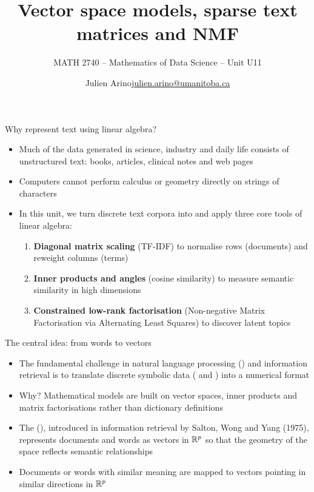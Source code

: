 \documentclass[aspectratio=169]{beamer}\usepackage[]{graphicx}\usepackage[]{xcolor}
\subtitle{MATH 2740 -- Mathematics of Data Science -- Unit U11}
\author{\texorpdfstring{Julien Arino\newline\url{julien.arino@umanitoba.ca}}{Julien Arino}}
\institute{Department of Mathematics @ University of Manitoba}
\title{Vector space models, sparse text matrices and NMF}
\begin{document}
\setcounter{theorem}{166}

\SStitlepage
\SSoutlinepage


\begin{frame}{Why represent text using linear algebra?}
\begin{itemize}
\item Much of the data generated in science, industry and daily life consists of unstructured text: books, articles, clinical notes and web pages
\vfill
\item Computers cannot perform calculus or geometry directly on strings of characters
\vfill
\item In this unit, we turn discrete text corpora into  and apply three core tools of linear algebra:
\begin{enumerate}
\item \textbf{Diagonal matrix scaling} (TF-IDF) to normalise rows (documents) and reweight columns (terms)
\item \textbf{Inner products and angles} (cosine similarity) to measure semantic similarity in high dimensions
\item \textbf{Constrained low-rank factorisation} (Non-negative Matrix Factorisation via Alternating Least Squares) to discover latent topics
\end{enumerate}
\end{itemize}
\end{frame}



\begin{frame}{The central idea: from words to vectors}
\begin{itemize}
\item The fundamental challenge in natural language processing () and information retrieval is to translate discrete symbolic data ( and ) into a numerical format
\vfill
\item Why? Mathematical models are built on vector spaces, inner products and matrix factorisations rather than dictionary definitions
\vfill
\item The  (), introduced in information retrieval by Salton, Wong and Yang (1975), represents documents and words as vectors in $\mathbb{R}^p$ so that the geometry of the space reflects semantic relationships
\vfill
\item Documents or words with similar meaning are mapped to vectors pointing in similar directions in $\mathbb{R}^p$
\end{itemize}
\end{frame}
\end{document}
